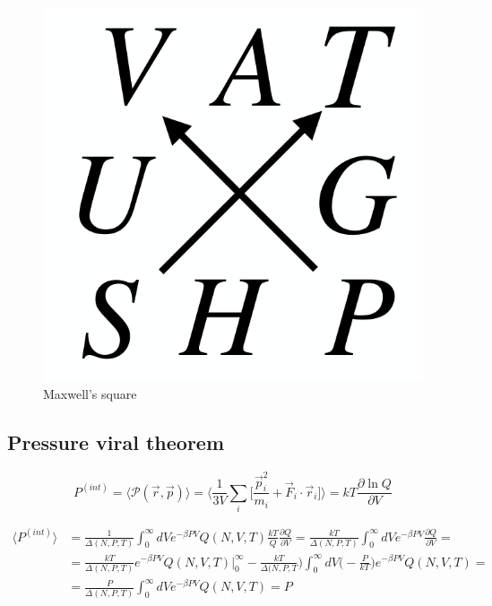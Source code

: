 	\begin{figure}[H]
		\includegraphics[scale = 0.3]{maxwell_square}
		\centering
		\caption{Maxwell's square}
	\end{figure}

	\subsection{Pressure viral theorem}

	$$P^{(int)} =\langle\mathcal{P}(\vec{r}, \vec{p})\rangle = \biggl\langle\frac{1}{3V}\sum\limits_i\biggl[\frac{\vec{p}_i^2}{m_i} + \vec{F}_i\cdot\vec{r}_i\biggr]\biggr\rangle = kT\frac{\partial\ln Q}{\partial V}$$

	\begin{align*}
		\langle P^{(int)}\rangle &= \frac{1}{\Delta(N, P, T)}\int_0^{\infty}dVe^{-\beta PV}Q(N, V, T)\frac{kT}{Q}\frac{\partial Q}{\partial V} = \frac{kT}{\Delta(N, P, T)}\int_0^{\infty}dVe^{-\beta PV}\frac{\partial Q}{\partial V}=\\
														 &= \frac{kT}{\Delta(N, P, T)}e^{-\beta PV}Q(N, V, T)|_0^{\infty}-\frac{kT}{\Delta(N, P, T})\int_0^{\infty}dV\biggl(-\frac{P}{kT}\biggr)e^{-\beta PV}Q(N, V, T) = \\
														 &=\frac{P}{\Delta(N, P, T)}\int_0^{\infty}dVe^{-\beta PV}Q(N, V, T) = P
	\end{align*}

